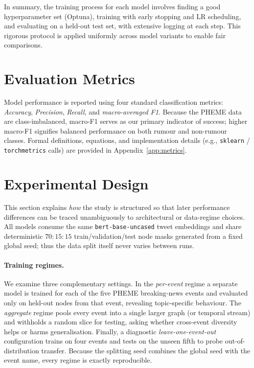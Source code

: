 \documentclass{cshonours}
\begin{document}
In summary, the training process for each model involves finding a good hyperparameter set (Optuna), training with early stopping and LR scheduling, and evaluating on a held-out test set, with extensive logging at each step. This rigorous protocol is applied uniformly across model variants to enable fair comparisons.

\section{Evaluation Metrics}
\label{sec:eval-metrics}

Model performance is reported using four standard classification metrics: \emph{Accuracy}, \emph{Precision}, \emph{Recall}, and \emph{macro-averaged F1}.  
Because the PHEME data are class-imbalanced, macro-F1 serves as our primary indicator of success; higher macro-F1 signifies balanced performance on both rumour and non-rumour classes.  
Formal definitions, equations, and implementation details (e.g., \texttt{sklearn} / \texttt{torchmetrics} calls) are provided in Appendix~\ref{app:metrics}.


\section{Experimental Design}
\label{sec:experimental_design}

This section explains \emph{how} the study is structured so that later performance differences can be traced unambiguously to architectural or data-regime choices.  All models consume the same \texttt{bert-base-uncased} tweet embeddings and share deterministic \(70{:}15{:}15\) train/validation/test node masks generated from a fixed global seed; thus the data split itself never varies between runs.

\paragraph{Training regimes.}
We examine three complementary settings.  In the \emph{per-event} regime a separate model is trained for each of the five PHEME breaking-news events and evaluated only on held-out nodes from that event, revealing topic-specific behaviour.  The \emph{aggregate} regime pools every event into a single larger graph (or temporal stream) and withholds a random slice for testing, asking whether cross-event diversity helps or harms generalisation.  Finally, a diagnostic \emph{leave-one-event-out} configuration trains on four events and tests on the unseen fifth to probe out-of-distribution transfer.  Because the splitting seed combines the global seed with the event name, every regime is exactly reproducible.
\end{document}
